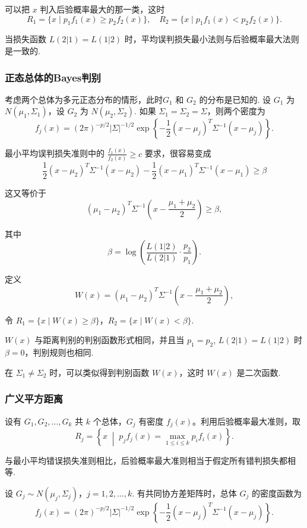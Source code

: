 \documentclass[12pt, a4paper, oneside]{ctexart}
\begin{document}
	可以把 $x$ 判入后验概率最大的那一类，这时
	\begin{equation}
		R_1 = \{ x \mid p_1 f_1(x) \geq p_2 f_2(x) \}, \quad
		R_2 = \{ x \mid p_1 f_1(x) < p_2 f_2(x) \}.
	\end{equation}
	
	当损失函数 $L(2|1) = L(1|2)$ 时，平均误判损失最小法则与后验概率最大法则是一致的.
	
	\subsubsection{正态总体的Bayes判别}
	考虑两个总体为多元正态分布的情形，此时$G_1$ 和 $G_2$ 的分布是已知的. 设 $G_1$ 为 $N(\mu_1, \Sigma_1)$，设 $G_2$ 为 $N(\mu_2, \Sigma_2)$. 如果 $\Sigma_1 = \Sigma_2 = \Sigma$，则两个密度为
	\[
	f_j(x) = (2\pi)^{-p/2}|\Sigma|^{-1/2} \exp \left\{ -\frac{1}{2}(x - \mu_j)^T \Sigma^{-1}(x - \mu_j) \right\}.
	\]
	
	最小平均误判损失准则中的 $\frac{f_1(x)}{f_2(x)} \geq c$ 要求，很容易变成
	\[
	\frac{1}{2}(x - \mu_2)^T \Sigma^{-1} (x - \mu_2) - \frac{1}{2}(x - \mu_1)^T \Sigma^{-1}(x - \mu_1) \geq \beta
	\]
	
	这又等价于
	\[
	(\mu_1 - \mu_2)^T \Sigma^{-1} \left(x - \frac{\mu_1 + \mu_2}{2} \right) \geq \beta,
	\]
	
	其中
	\[
	\beta = \log \left( \frac{L(1|2)}{L(2|1)} \cdot \frac{p_2}{p_1} \right).
	\]
	
	定义
	\[
	W(x) = (\mu_1 - \mu_2)^T \Sigma^{-1} \left( x - \frac{\mu_1 + \mu_2}{2} \right),
	\]
	
	令 $R_1 = \{ x \mid W(x) \geq \beta \}$，$R_2 = \{ x \mid W(x) < \beta \}$.
	
	$W(x)$ 与距离判别的判别函数形式相同，并且当 $p_1 = p_2$, $L(2|1) = L(1|2)$ 时 $\beta = 0$，判别规则也相同.
	
	在 $\Sigma_1 \neq \Sigma_2$ 时，可以类似得到判别函数 $W(x)$，这时 $W(x)$ 是二次函数.
	\subsubsection{广义平方距离}
	设有 $G_1, G_2, \ldots, G_k$ 共 $k$ 个总体，$G_j$ 有密度 $f_j(x)$。利用后验概率最大准则，取
	\[
	R_j = \left\{ x \;\middle|\; p_j f_j(x) = \max_{1 \leq i \leq k} p_i f_i(x) \right\}.
	\]
	
	与最小平均错误损失准则相比，后验概率最大准则相当于假定所有错判损失都相等.
	
	设 $G_j\sim N(\mu_j, \Sigma_j)$，$j = 1,2,\ldots,k$. 有共同协方差矩阵时，总体 $G_j$ 的密度函数为
	\[
	f_j(x) = (2\pi)^{-p/2} |\Sigma|^{-1/2} \exp \left\{ -\frac{1}{2} (x - \mu_j)^T \Sigma^{-1} (x - \mu_j) \right\}.
	\]
	
\end{document}

